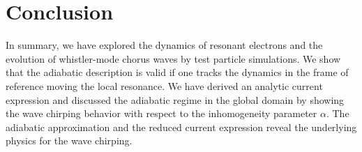 \section{Conclusion}
\label{sec:conc}
In summary, we have explored the dynamics of resonant electrons and the evolution of whistler-mode chorus waves by test particle simulations.
We show that the adiabatic description is valid if one tracks the dynamics in the frame of reference moving the local resonance.
We have derived an analytic current expression and discussed the adiabatic regime in the global domain by showing the wave chirping behavior with respect to the inhomogeneity parameter $\alpha$.
The adiabatic approximation and the reduced current expression reveal the underlying physics for the wave chirping.